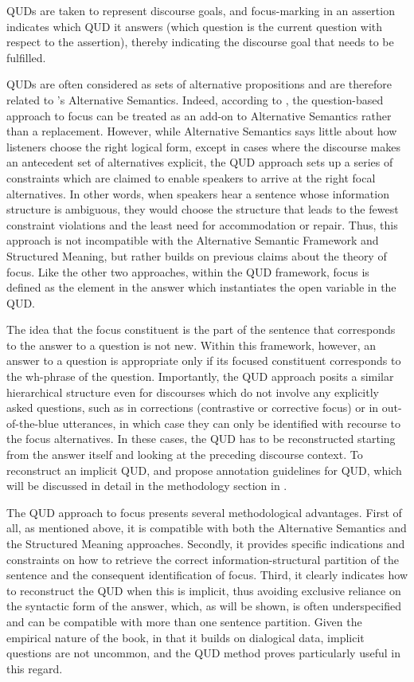 QUDs are taken to represent discourse goals, and focus-marking in an assertion indicates which QUD it answers (which question is the current question with respect to the assertion), thereby indicating the discourse goal that needs to be fulfilled.

QUDs are often considered as sets of alternative propositions and are therefore related to \textcite{rooth1985association, rooth1992theory}'s Alternative Semantics. Indeed, according to \textcite{velleman2016question}, the question-based approach to focus can be treated as an add-on to Alternative Semantics rather than a replacement.
However, while Alternative Semantics says little about how listeners choose the right logical form, except in cases where the discourse makes an antecedent set of alternatives explicit, the QUD approach sets up a series of constraints which are claimed to enable speakers to arrive at the right focal alternatives. In other words, when speakers hear a sentence whose information structure is ambiguous, they would choose the structure that leads to the fewest constraint violations and the least need for accommodation or repair.
Thus, this approach is not incompatible with the Alternative Semantic Framework and Structured Meaning, but rather builds on previous claims about the theory of focus. Like the other two approaches, within the QUD framework, focus is defined as the element in the answer which instantiates the open variable in the QUD. 

The idea that the focus constituent is the part of the sentence that corresponds to the answer to a question \parencite{bresnan1989locative} is not new. Within this framework, however, an answer to a question is appropriate only if its focused constituent corresponds to the wh-phrase of the question. 
Importantly, the QUD approach posits a similar hierarchical structure even for discourses which do not involve any explicitly asked questions, such as in corrections (contrastive or corrective focus) or in out-of-the-blue utterances, in which case they can only be identified with recourse to the focus alternatives.
 In these cases, the QUD has to be reconstructed starting from the answer itself and looking at the preceding discourse context. To reconstruct an implicit QUD, \textcite{riester2018annotation} and \textcite{riester2019constructing} propose annotation guidelines for QUD, which will be discussed in detail in the methodology section in . 
 
The QUD approach to focus presents several methodological advantages. First of all, as mentioned above, it is compatible with both the Alternative Semantics and the Structured Meaning approaches. Secondly, it provides specific indications and constraints on how to retrieve the correct information-structural partition of the sentence and the consequent identification of focus. Third, it clearly indicates how to reconstruct the QUD when this is implicit, thus avoiding exclusive reliance on the syntactic form of the answer, which, as will be shown, is often underspecified and can be compatible with more than one sentence partition. Given the empirical nature of the book, in that it builds on dialogical data, implicit questions are not uncommon, and the QUD method proves particularly useful in this regard.
 
